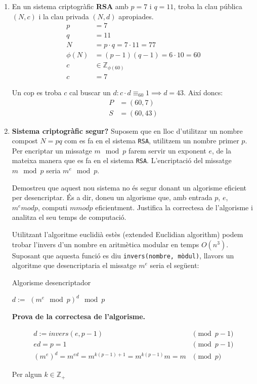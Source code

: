 \documentclass[a4paper]{article}
\begin{document}
\begin{enumerate}
\begin{enumerate}
\end{enumerate} 

\item En un sistema criptogràfic \textbf{RSA} amb $p = 7$ i $q = 11$, troba la clau pública $(N, c)$ i la clau privada $(N, d)$ apropiades.
\begin{align*}
	p &= 7 \\
	q &= 11 \\
	N &= p \cdot q = 7 \cdot 11 = 77 \\
	\phi(N) &= (p - 1)(q - 1) = 6 \cdot 10 = 60 \\
	c &\in \mathbb{Z}_{\phi(60)} \\
	c &= 7
\end{align*}

Un cop es troba $c$ cal buscar un $d : c \cdot d \equiv_{60} 1 \implies d = 43$. Així doncs:
\begin{align*}
	P &= (60, 7) \\
	S &= (60, 43)
\end{align*}

\item \textbf{Sistema criptogràfic segur?} Suposem que en lloc d'utilitzar un nombre compost $N = pq$ com es fa en el sistema \texttt{RSA}, utilitzem un nombre primer $p$. Per encriptar un missatge $m \mod p$ farem servir un exponent $e$, de la mateixa manera que es fa en el sistema \texttt{RSA}. L'encriptació del missatge $m \mod p$ seria $m^e \mod p$.

Demostreu que aquest nou sistema no és segur donant un algorisme eficient per
desencriptar. És a dir, doneu un algorisme que, amb entrada $p$, $e$, $m^e mod p$, computi $m mod p$ eficientment. Justifica la correctesa de l'algorisme i analitza el seu temps de computació.

Utilitzant l'algoritme euclidià estès (extended Euclidian algorithm) podem trobar l'invers d'un nombre en aritmètica modular en temps $O(n^3)$. Suposant que aquesta funció es diu \texttt{invers(nombre, mòdul)}, llavors un algoritme que desencriptaria el missatge $m^e$ seria el següent:

\begin{algorithm}[H]
	\caption{Algorisme desencriptador}
	\begin{algorithmic}
			\State $d :=$ 
			\State \Return $(m^e \mod p)^d \mod p$
		\EndFunction
	\end{algorithmic}
\end{algorithm}

\textbf{Prova de la correctesa de l'algorisme.}


\begin{align*}
	d := invers(e, p-1) &\pmod{p-1} \\
	e d = p = 1 &\pmod{p-1} \\
	(m^e)^d = m^{e d} = m^{k(p-1)+1} = m^{k(p-1)} m = m &\pmod{p}
\end{align*}

Per algun $k \in \mathbb{Z}_+$

\end{enumerate}
\end{document}
